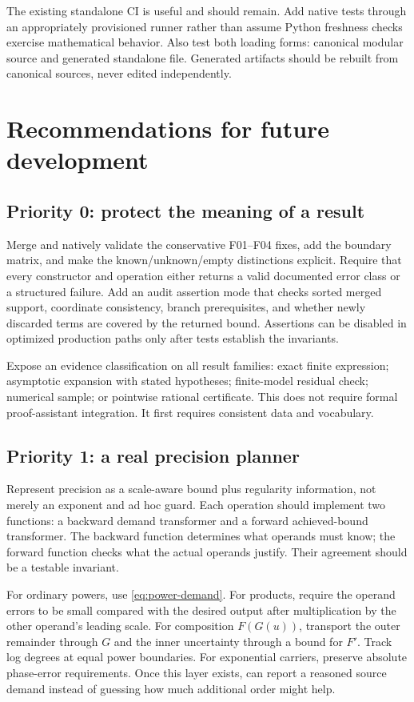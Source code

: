\documentclass[11pt,letterpaper]{article}
\newcommand{\code}[1]{\texttt{\small\detokenize{#1}}}
\begin{document}
The existing standalone CI is useful and should remain. Add native tests through an appropriately provisioned runner rather than assume Python freshness checks exercise mathematical behavior. Also test both loading forms: canonical modular source and generated standalone file. Generated artifacts should be rebuilt from canonical sources, never edited independently.\cite{repo-ci,repo-validation}

\section{Recommendations for future development}
\label{sec:roadmap}
\subsection{Priority 0: protect the meaning of a result}
Merge and natively validate the conservative F01--F04 fixes, add the boundary matrix, and make the known/unknown/empty distinctions explicit. Require that every constructor and operation either returns a valid documented error class or a structured failure. Add an audit assertion mode that checks sorted merged support, coordinate consistency, branch prerequisites, and whether newly discarded terms are covered by the returned bound. Assertions can be disabled in optimized production paths only after tests establish the invariants.

Expose an evidence classification on all result families: exact finite expression; asymptotic expansion with stated hypotheses; finite-model residual check; numerical sample; or pointwise rational certificate. This does not require formal proof-assistant integration. It first requires consistent data and vocabulary.

\subsection{Priority 1: a real precision planner}
Represent precision as a scale-aware bound plus regularity information, not merely an exponent and ad hoc guard. Each operation should implement two functions: a backward demand transformer and a forward achieved-bound transformer. The backward function determines what operands must know; the forward function checks what the actual operands justify. Their agreement should be a testable invariant.

For ordinary powers, use \eqref{eq:power-demand}. For products, require the operand errors to be small compared with the desired output after multiplication by the other operand's leading scale. For composition $F(G(u))$, transport the outer remainder through $G$ and the inner uncertainty through a bound for $F'$. Track log degrees at equal power boundaries. For exponential carriers, preserve absolute phase-error requirements. Once this layer exists, \code{SeriesRefine} can report a reasoned source demand instead of guessing how much additional order might help.
\end{document}
